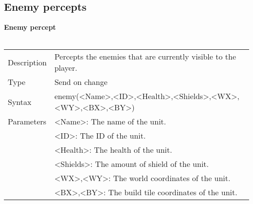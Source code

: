 \documentclass[english,11pt]{report}
\begin{document}
\subsection{Enemy percepts}
\textbf{Enemy percept}\\
\\
\begin{tabularx}{\textwidth}{lX}
 Description & Percepts the enemies that are currently visible to the player. \\
 Type & Send on change \\
 Syntax & enemy(<Name>,<ID>,<Health>,<Shields>,<WX>,<WY>,<BX>,<BY>) \\
 Parameters &   <Name>: The name of the unit.\\
            &   <ID>: The ID of the unit.\\
            &   <Health>: The health of the unit.\\
            &   <Shields>: The amount of shield of the unit.\\
            &   <WX>,<WY>: The world coordinates of the unit.\\
            &   <BX>,<BY>: The build tile coordinates of the unit.
\end{tabularx}\\
\\
\\
\end{document}
